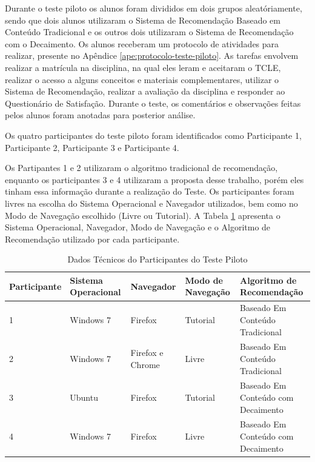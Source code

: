 Durante o teste piloto os alunos foram divididos em dois grupos aleatóriamente, sendo que dois alunos utilizaram o Sistema de Recomendação
Baseado em Conteúdo Tradicional e os outros dois utilizaram o Sistema de Recomendação com o Decaimento. Os alunos receberam
um protocolo de atividades para realizar, presente no Apêndice \ref{ape:protocolo-teste-piloto}. As tarefas envolvem
realizar a matrícula na disciplina, na qual eles leram e aceitaram o TCLE, realizar o acesso a alguns conceitos e
materiais complementares, utilizar o Sistema de Recomendação, realizar a avaliação da disciplina e responder ao Questionário
de Satisfação. Durante o teste, os comentários e observações feitas pelos alunos foram anotadas para posterior análise.

Os quatro participantes do teste piloto foram identificados como Participante 1, Participante 2,
Participante 3 e Participante 4.

Os Partipantes 1 e 2 utilizaram o algoritmo tradicional de recomendação, enquanto os participantes 3 e 4 utilizaram a
proposta desse trabalho, porém eles tinham essa informação durante a realização do Teste. Os participantes foram livres na escolha do Sistema Operacional e Navegador utilizados, bem como
no Modo de Navegação escolhido (Livre ou Tutorial). A Tabela \ref{tab:participantes-teste-piloto} apresenta o
Sistema Operacional, Navegador, Modo de Navegação e o Algoritmo de Recomendação utilizado por
cada participante.

\begin{table}[h]
\footnotesize
\caption[Dados Técnicos do Participantes do Teste Piloto]{Dados Técnicos do Participantes do Teste Piloto}
\label{tab:participantes-teste-piloto}
\centering
\begin{tabular}{|p{2cm}|p{2.5cm}|p{2.5cm}|p{2.5cm}|p{2.5cm}|}
  \hline
  \textbf{Participante} & \textbf{Sistema Operacional} & \textbf{Navegador} & \textbf{Modo de Navegação} & \textbf{Algoritmo de Recomendação} \\
  \hline
  1 & Windows 7 & Firefox & Tutorial & Baseado Em Conteúdo Tradicional \\
  \hline
  2 & Windows 7 & Firefox e Chrome & Livre & Baseado Em Conteúdo Tradicional \\
  \hline
  3 & Ubuntu & Firefox & Tutorial & Baseado Em Conteúdo com Decaimento \\
  \hline
  4 & Windows 7 & Firefox & Livre & Baseado Em Conteúdo com Decaimento \\
  \hline
\end{tabular}
\end{table}

